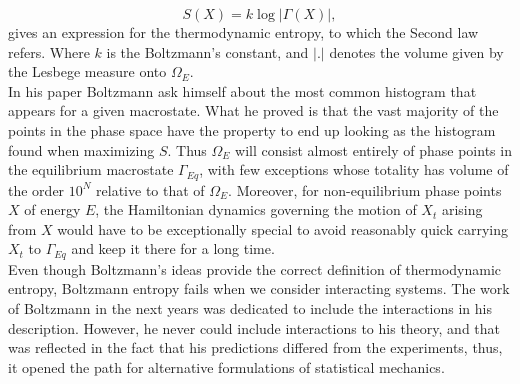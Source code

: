 \begin{equation}
S(X)= k \log |\Gamma(X)|,
\label{CH1:Boltzmann_entropy}
\end{equation}
gives an expression for the thermodynamic entropy, to which the Second law refers. Where $k$ is the Boltzmann's constant, and $|.|$ denotes the volume given by the Lesbege measure onto $\Omega_E$.\\
\indent In his paper \cite{boltzmann1871prioritat} Boltzmann ask himself about the most common histogram that appears for a given macrostate. What he proved is that the vast majority of the points in the phase space have the property to end up looking as the histogram found when maximizing $S$. Thus $\Omega_E$ will consist almost entirely of phase points in the equilibrium macrostate $\Gamma_{Eq}$, with few exceptions whose totality has volume of the order $10^N$ relative to that of $\Omega_E$. Moreover, for non-equilibrium phase points $X$ of energy $E$, the Hamiltonian dynamics governing the motion of $X_t$ arising from $X$ would have to be exceptionally special to avoid reasonably quick carrying $X_t$ to $\Gamma_{Eq}$ and keep it there for a long time. \\
\indent Even though Boltzmann's ideas provide the correct definition of thermodynamic entropy, Boltzmann entropy fails when we consider interacting systems\cite{garrido_boltzmann_2004, goldstein_boltzmann_2004 }. The work of Boltzmann in the next years \cite{boltzmann1866mechanische, boltzmann1877beziehung} was dedicated to include the interactions in his description. However, he never could include interactions to his theory, and that was reflected in the fact that his predictions differed from the experiments, thus, it opened the path for alternative formulations of statistical mechanics.
